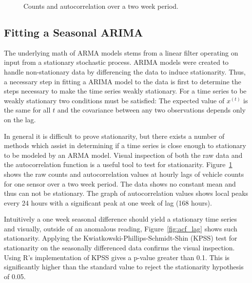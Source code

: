 \begin{figure}[t]
\begin{center}
\end{center}
\caption{Counts and autocorrelation over a two week period.}
\label{fig:raw_data}
\end{figure}


\subsection{Fitting a Seasonal ARIMA}
The underlying math of ARMA models stems from a linear filter operating on input from a stationary stochastic process.  ARIMA models were created to handle non-stationary data by differencing the data to induce stationarity.  Thus, a necessary step in fitting a ARIMA model to the data is first to determine the steps necessary to make the time series weakly stationary.  For a time series to be weakly stationary two conditions must be satisfied: The expected value of $x^{(t)}$ is the same for all $t$ and the covariance between any two observations depends only on the lag.  

In general it is difficult to prove stationarity, but there exists a number of methods which assist in determining if a time series is close enough to stationary to be modeled by an ARMA model.  Visual inspection of both the raw data and the autocorrelation function is a useful tool to test for stationarity.  Figure~\ref{fig:raw_data} shows the raw counts and autocorrelation values at hourly lags of vehicle counts for one sensor over a two week period.  The data shows no constant mean and thus can not be stationary.  The graph of autocorrelation values shows local peaks every 24 hours with a significant peak at one week of lag (168 hours).

Intuitively a one week seasonal difference should yield a stationary time series and visually, outside of an anomalous reading, Figure~\ref{fig:acf_lag} shows such stationarity.  Applying the Kwiatkowski-Phillips-Schmidt-Shin (KPSS) \cite{Kwiatkowski1992} test for stationarity on the seasonally differenced data confirms the visual inspection.  Using R's implementation of KPSS gives a p-value greater than 0.1.  This is significantly higher than the standard value to reject the stationarity hypothesis of 0.05.  

